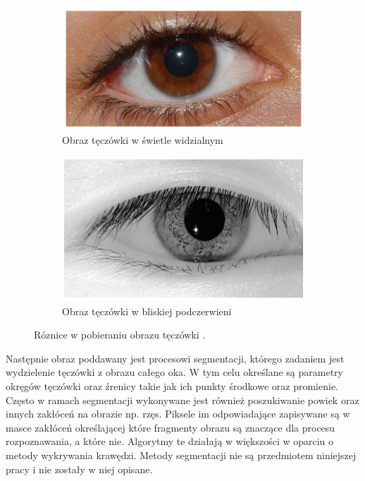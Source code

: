 \documentclass[10pt,polish,a4paper,oneside]{ppfcmthesis}
\begin{document}
\begin{figure}[ht]
  \centering
  \begin{subfigure}[b]{0.4\textwidth}
    \centering
    \includegraphics[width=\textwidth]{images/intro/eyeDaylight.png}
    \caption{Obraz tęczówki w świetle widzialnym}
  \end{subfigure}
  \begin{subfigure}[b]{0.4\textwidth}
    \centering
    \includegraphics[width=\textwidth]{images/intro/eyeInfraRed.png}
    \caption{Obraz tęczówki w bliskiej podczerwieni}
  \end{subfigure}
  \caption{Róznice w pobieraniu obrazu tęczówki \cite{IrisRecognitionPresentation}.}
  \label{fig:irisAcquisitionExample}
\end{figure}


Następnie obraz poddawany jest procesowi segmentacji, którego zadaniem jest wydzielenie tęczówki z obrazu
całego oka. W tym celu określane są parametry okręgów
tęczówki oraz \'zrenicy takie jak ich punkty środkowe oraz promienie. Często w ramach segmentacji
wykonywane jest również poszukiwanie powiek oraz innych zakłóceń na obrazie np. rzęs. Piksele im odpowiadające
zapisywane są w masce zakłóceń określającej które fragmenty obrazu są znaczące dla procesu rozpoznawania,
a które nie. Algorytmy te działają w większości w oparciu o metody wykrywania krawędzi.
Metody segmentacji nie są przedmiotem niniejszej pracy i nie zostały w niej opisane.\newline
\end{document}
